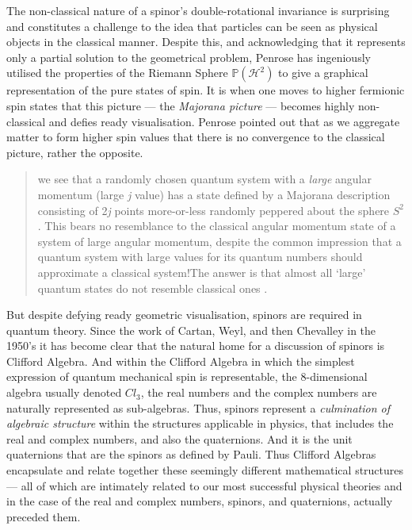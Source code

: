 \documentclass[11pt,oneside,a4paper]{article}
\newcommand{\Hilbtwo}{\ensuremath{\mathscr{H}^{2}}\xspace}
\begin{document}
The non-classical nature of a spinor's double-rotational invariance is surprising and constitutes a challenge to the idea that particles can be seen as physical objects in the classical manner. Despite this, and acknowledging that it represents only a partial solution to the geometrical problem, Penrose has ingeniously utilised the properties of the Riemann Sphere $\mathbb{P}(\Hilbtwo)$ to give a graphical representation of the pure states of spin. It is when one moves to higher fermionic spin states that this picture --- the \textit{Majorana picture} --- becomes highly non-classical and defies ready visualisation. Penrose pointed out that as we aggregate matter to form higher spin values that  there is no convergence to the classical picture, rather the opposite. 
\begin{quotation}\noindent
\xelip we see that a randomly chosen quantum system with a \textit{large} angular momentum (large \textit{j} value) has a state defined by a Majorana description consisting of 2\textit{j} points more-or-less randomly peppered about the sphere $S^{2}$. This bears no resemblance to the classical angular momentum state of a system of large angular momentum, despite the common impression that a quantum system with large values for its quantum numbers should approximate a classical system!\xelip The answer is that almost all `large' quantum states do not resemble classical ones \parencites[566]{penrose_road_2004}[also see][]{penrose_spinors_1987}{penrose_spinors_1988}.
\end{quotation}

But despite defying ready geometric visualisation, spinors are required in quantum theory. Since the work of Cartan, Weyl, and then Chevalley in the 1950's it has become clear that the natural home for a discussion of spinors is Clifford Algebra. And within the Clifford Algebra in which the simplest expression of quantum mechanical spin is representable, the 8-dimensional algebra usually denoted $\mathit{Cl}_{3}$, the real numbers and the complex numbers are naturally represented as sub-algebras. Thus, spinors represent a \textit{culmination of algebraic structure} within the structures applicable in physics, that includes the real and complex numbers, and also the quaternions. And it is the unit quaternions that are the spinors as defined by Pauli. Thus Clifford Algebras encapsulate and relate together these seemingly different mathematical structures --- all of which are intimately related to our most successful physical theories and in the case of the real and  complex numbers, spinors, and quaternions, actually preceded them.
\end{document}
